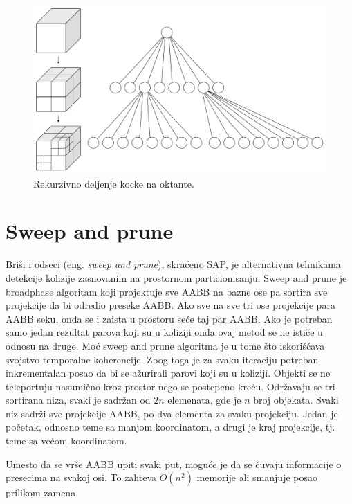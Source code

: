 \documentclass[12pt,oneside]{memoir}
\begin{document}
\begin{figure}[h!]
	\begin{center}
	\includegraphics[scale=0.22]{octree.png}
	\end{center}
	\caption{Rekurzivno deljenje kocke na oktante.}
	\label{fig:oct}
\end{figure}



\section{Sweep and prune}
\label{subsec:sap}

Briši i odseci (eng. {\em sweep and prune}), skraćeno SAP, je alternativna tehnikama detekcije kolizije 
zasnovanim na prostornom particionisanju.
Sweep and prune je broadphase algoritam koji projektuje sve AABB
na bazne ose pa sortira sve projekcije da bi odredio preseke AABB.
Ako sve na sve tri ose projekcije para AABB seku, onda se i zaista u prostoru seče taj par AABB.
Ako je potreban samo jedan rezultat parova koji su u koliziji onda ovaj metod se ne ističe u odnosu na druge.
Moć sweep and prune algoritma je u tome što iskorišćava svojstvo temporalne koherencije.
Zbog toga je za svaku iteraciju potreban inkrementalan posao da bi se ažurirali parovi koji su u koliziji.
Objekti se ne teleportuju nasumično kroz prostor nego se postepeno kreću. 
Održavaju se tri sortirana niza, svaki je sadržan od $2n$ elemenata, gde je $n$ broj objekata.
Svaki niz sadrži sve projekcije AABB, po dva elementa za svaku projekciju. 
Jedan je početak, odnosno teme sa manjom koordinatom, a drugi je kraj projekcije, tj. teme sa većom koordinatom. 

Umesto da se vrše AABB upiti svaki put, moguće je da se čuvaju informacije o presecima 
na svakoj osi. To zahteva $O(n^2)$ memorije ali smanjuje posao prilikom zamena. \cite{sap}
\end{document}
